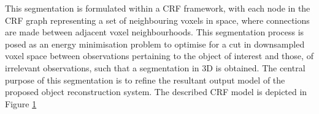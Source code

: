 This segmentation is formulated within a CRF framework, with each node in the
CRF graph representing a set of neighbouring voxels in space, where connections
are made between adjacent voxel neighbourhoods. This segmentation process is
posed as an energy minimisation problem to optimise for a cut in downsampled
voxel space between observations pertaining to the object of interest and those,
of irrelevant observations, such that a segmentation in 3D is obtained. The
central purpose of this segmentation is to refine the resultant output model of
the proposed object reconstruction system. The described CRF model is depicted
in Figure \ref{fig:probobj_crf}

\begin{figure}[h]
  \label{fig:probobj_crf}
  \centering
\end{figure}
